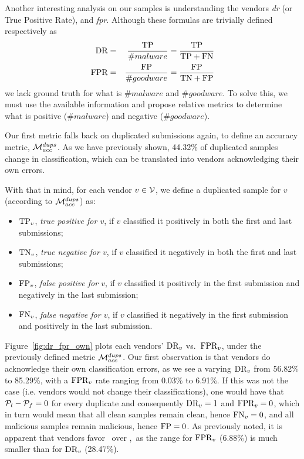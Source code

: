 Another interesting analysis on our samples is understanding the vendors \emph{\gls{dr}} (or True Positive Rate), and \emph{\gls{fpr}}.
Although these formulas are trivially defined respectively as
\begin{eqnarray}
\textrm{DR}&=&\frac{\textrm{TP}}{\#malware}=\frac{\textrm{TP}}{\textrm{TP}+\textrm{FN}} \\ 
\textrm{FPR}&=&\frac{\textrm{FP}}{\#goodware}=\frac{\textrm{FP}}{\textrm{TN}+\textrm{FP}}
\end{eqnarray}
we lack ground truth for what is $\#malware$ and $\#goodware$.
To solve this, we must use the available information and propose relative metrics to determine what is positive ($\#malware$) and negative ($\#goodware$).

Our first metric falls back on duplicated submissions again, to define an accuracy metric, $\mathcal{M}_{acc}^{{dups}}$. As we have previously shown, 44.32\% of duplicated samples change in classification, which can be translated into vendors acknowledging their own errors.

With that in mind, for each vendor $v\in\mathcal{V}$, we define a duplicated sample for $v$ (according to $\mathcal{M}_{acc}^{{dups}}$) as:
\begin{itemize}
	\item $\textrm{TP}_v$, \emph{true positive for $v$}, if $v$ classified it positively in both the first and last submissions;
	\item $\textrm{TN}_v$, \emph{true negative for $v$}, if $v$ classified it negatively in both the first and last submissions;
	\item $\textrm{FP}_v$, \emph{false positive for $v$}, if $v$ classified it positively in the first submission and negatively in the last submission;
	\item $\textrm{FN}_v$, \emph{false negative for $v$}, if $v$ classified it negatively in the first submission and positively in the last submission.
\end{itemize}

Figure~\ref{fig:dr_fpr_own} plots each vendors' $\textrm{DR}_v$ vs.\ $\textrm{FPR}_v$, under the previously defined metric $\mathcal{M}_{acc}^{{dups}}$.
Our first observation is that vendors do acknowledge their own classification errors, as we see a varying $\textrm{DR}_v$ from 56.82\% to 85.29\%, with a $\textrm{FPR}_v$ rate ranging from 0.03\% to 6.91\%.
If this was not the case (i.e. vendors would not change their classifications), one would have that $\mathcal{P}_{l}-\mathcal{P}_{f} = 0$ for every duplicate and consequently $\textrm{DR}_v = 1$ and $\textrm{FPR}_v = 0$, which in turn would mean that all clean samples remain clean, hence $\textrm{FN}_v=0$, and all malicious samples remain malicious, hence $\textrm{FP}=0$.
As previously noted, it is apparent that vendors favor \fn\ over \fp,\ as the range for $\textrm{FPR}_v$ (6.88\%) is much smaller than for $\textrm{DR}_v$ (28.47\%).

